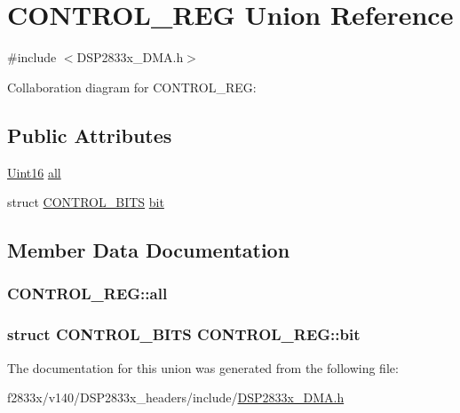\hypertarget{union_c_o_n_t_r_o_l___r_e_g}{}\section{C\+O\+N\+T\+R\+O\+L\+\_\+\+R\+E\+G Union Reference}
\label{union_c_o_n_t_r_o_l___r_e_g}


{\ttfamily \#include $<$D\+S\+P2833x\+\_\+\+D\+M\+A.\+h$>$}



Collaboration diagram for C\+O\+N\+T\+R\+O\+L\+\_\+\+R\+E\+G\+:
\subsection*{Public Attributes}
\begin{DoxyCompactItemize}
\item 
\hyperlink{_d_s_p2833x___device_8h_a59a9f6be4562c327cbfb4f7e8e18f08b}{Uint16} \hyperlink{union_c_o_n_t_r_o_l___r_e_g_a60cc3ce040872f9bfafc6dbbf28ac659}{all}
\item 
struct \hyperlink{struct_c_o_n_t_r_o_l___b_i_t_s}{C\+O\+N\+T\+R\+O\+L\+\_\+\+B\+I\+T\+S} \hyperlink{union_c_o_n_t_r_o_l___r_e_g_aafa5802bf993fd920b5c1582572b8570}{bit}
\end{DoxyCompactItemize}


\subsection{Member Data Documentation}
\hypertarget{union_c_o_n_t_r_o_l___r_e_g_a60cc3ce040872f9bfafc6dbbf28ac659}{}
\subsubsection[{all}]{ C\+O\+N\+T\+R\+O\+L\+\_\+\+R\+E\+G\+::all}\label{union_c_o_n_t_r_o_l___r_e_g_a60cc3ce040872f9bfafc6dbbf28ac659}
\hypertarget{union_c_o_n_t_r_o_l___r_e_g_aafa5802bf993fd920b5c1582572b8570}{}
\subsubsection[{bit}]{\setlength{\rightskip}{0pt plus 5cm}struct {\bf C\+O\+N\+T\+R\+O\+L\+\_\+\+B\+I\+T\+S} C\+O\+N\+T\+R\+O\+L\+\_\+\+R\+E\+G\+::bit}\label{union_c_o_n_t_r_o_l___r_e_g_aafa5802bf993fd920b5c1582572b8570}


The documentation for this union was generated from the following file\+:\begin{DoxyCompactItemize}
\item 
f2833x/v140/\+D\+S\+P2833x\+\_\+headers/include/\hyperlink{_d_s_p2833x___d_m_a_8h}{D\+S\+P2833x\+\_\+\+D\+M\+A.\+h}\end{DoxyCompactItemize}
